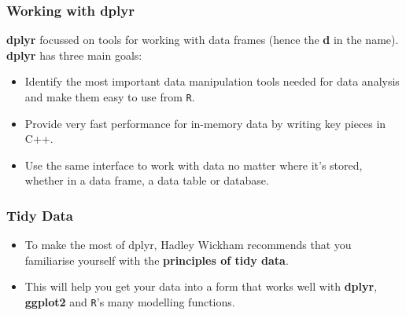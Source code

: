 \documentclass{beamer}
\begin{document}
\begin{frame}
	
	\frametitle{Working with dplyr} \textbf{dplyr} focussed on tools for working with data frames (hence the \textbf{d} in the name). 
\textbf{dplyr} has three main goals:

\begin{itemize}
	\item Identify the most important data manipulation tools needed for data analysis and make them easy to use from \texttt{R}.
	
	\item Provide very fast performance for in-memory data by writing key pieces in C++.
	
	\item Use the same interface to work with data no matter where it's stored, whether in a data frame, a data table or database.
\end{itemize}
\end{frame}
%	
\begin{frame}
\frametitle{Tidy Data}
\begin{itemize}

\item To make the most of dplyr, Hadley Wickham recommends that you familiarise yourself with the \textbf{principles of tidy data}. 
\item This will help you get your data into a form that works well with \textbf{dplyr}, \textbf{ggplot2} and \texttt{R}'s many modelling functions.
\end{itemize}
\end{frame}
\end{document}
